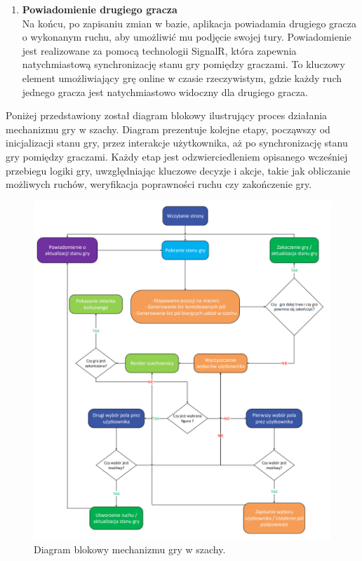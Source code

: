 \documentclass[12pt,a4paper]{article}
\begin{document}
\begin{enumerate}
    \item \textbf{Powiadomienie drugiego gracza}\\
    Na końcu, po zapisaniu zmian w bazie, aplikacja powiadamia drugiego gracza o wykonanym ruchu, aby umożliwić mu podjęcie swojej tury. Powiadomienie jest realizowane za pomocą technologii SignalR, która zapewnia natychmiastową synchronizację stanu gry pomiędzy graczami. To kluczowy element umożliwiający grę online w czasie rzeczywistym, gdzie każdy ruch jednego gracza jest natychmiastowo widoczny dla drugiego gracza.
\end{enumerate}

\newpage

\noindent
Poniżej przedstawiony został diagram blokowy ilustrujący proces działania mechanizmu gry w szachy. Diagram prezentuje kolejne etapy, począwszy od inicjalizacji stanu gry, przez interakcje użytkownika, aż po synchronizację stanu gry pomiędzy graczami. Każdy etap jest odzwierciedleniem opisanego wcześniej przebiegu logiki gry, uwzględniając kluczowe decyzje i akcje, takie jak obliczanie możliwych ruchów, weryfikacja poprawności ruchu czy zakończenie gry.

\vspace{1cm}
\begin{figure}[h!]
    \centering
    \includegraphics[width=1\textwidth]{images/diagram_gry.png}
    \caption{Diagram blokowy mechanizmu gry w szachy.}
\end{figure}
\end{document}
